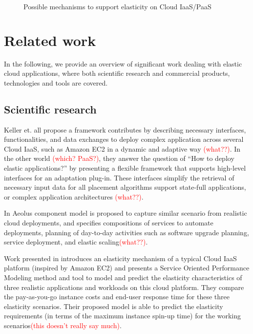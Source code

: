 \documentclass{sig-alternate}
\newcommand\todo[1]{\textcolor{red}{(#1)}}
\begin{document}
\begin{figure*}
\centering
{}
\caption{Possible mechanisms to support elasticity on Cloud IaaS/PaaS ~\cite{vaquero2011dynamically}}
\label{fig:scalabilitymechanisms}
\end{figure*}

\section{Related work}
\label{sec:rw}
In the following, we provide an overview of significant work dealing with elastic cloud applications, where both scientific research and commercial products, technologies and tools are covered.

\subsection{Scientific research}
\label{sec:scientific}
Keller et. all \cite{keller2013topology} propose a framework contributes by describing necessary interfaces, functionalities, and data exchanges to deploy complex application across several Cloud IaaS, such as Amazon EC2 in a dynamic and adaptive way \todo{what??}. In the other world \todo{which? PaaS?}, they answer the question of ``How to deploy elastic applications?'' by presenting a flexible framework that supports high-level interfaces for an adaptation plug-in. These interfaces simplify the retrieval of necessary input data for all placement algorithms support state-full applications, or complex application architectures \todo{what??}.

In \cite{di2012towards} Aeolus component model is proposed to capture similar scenario from realistic cloud deployments, and specifies compositions of services to automate deployments, planning of day-to-day activities such as software upgrade planning, service deployment, and elastic scaling\todo{what??}.

Work presented in \cite{brebner2012your} introduces an elasticity mechanism of a typical Cloud IaaS platform (inspired by Amazon EC2) and presents a Service Oriented Performance Modeling method and tool to model and predict the elasticity characteristics of three realistic applications and workloads on this cloud platform. They compare the pay-as-you-go instance costs and end-user response time for these three elasticity scenarios. Their proposed model is able to predict the elasticity requirements (in terms of the maximum instance spin-up time) for the working scenarios\todo{this doesn't really say much}.
\end{document}
